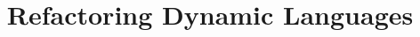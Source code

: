 \documentclass{sig-alternate-05-2015} %
\begin{document}






%

\title{Refactoring Dynamic Languages}
%
%
%
%
%
\end{document}
